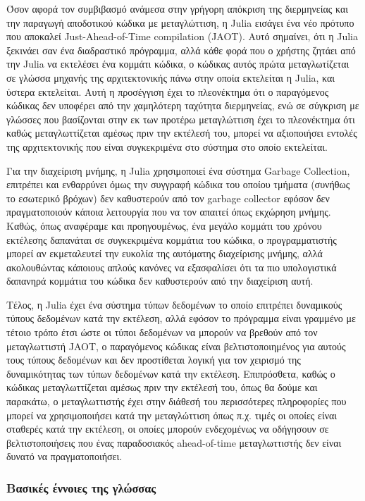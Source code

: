 Όσον αφορά τον συμβιβασμό ανάμεσα στην γρήγορη απόκριση της διερμηνείας και την παραγωγή αποδοτικού κώδικα με μεταγλώττιση, η Julia εισάγει ένα νέο πρότυπο που αποκαλεί Just-Ahead-of-Time compilation (JAOT).
Αυτό σημαίνει, ότι η Julia ξεκινάει σαν ένα διαδραστικό πρόγραμμα, αλλά κάθε φορά που ο χρήστης ζητάει από την Julia να εκτελέσει ένα κομμάτι κώδικα, ο κώδικας αυτός πρώτα μεταγλωτίζεται σε γλώσσα μηχανής της αρχιτεκτονικής πάνω στην οποία εκτελείται η Julia, και ύστερα εκτελείται.
Αυτή η προσέγγιση έχει το πλεονέκτημα ότι ο παραγόμενος κώδικας δεν υποφέρει από την χαμηλότερη ταχύτητα διερμηνείας, ενώ σε σύγκριση με γλώσσες που βασίζονται στην εκ των προτέρω μεταγλώττιση έχει το πλεονέκτημα ότι καθώς μεταγλωττίζεται αμέσως πριν την εκτέλεσή του, μπορεί να αξιοποιήσει εντολές της αρχιτεκτονικής που είναι συγκεκριμένα στο σύστημα στο οποίο εκτελείται.

Για την διαχείριση μνήμης, η Julia χρησιμοποιεί ένα σύστημα Garbage Collection, επιτρέπει και ενθαρρύνει όμως την συγγραφή κώδικα του οποίου τμήματα (συνήθως το εσωτερικό βρόχων) δεν καθυστερούν από τον garbage collector εφόσον δεν πραγματοποιούν κάποια λειτουργία που να τον απαιτεί όπως εκχώρηση μνήμης.
Καθώς, όπως αναφέραμε και προηγουμένως, ένα μεγάλο κομμάτι του χρόνου εκτέλεσης δαπανάται σε συγκεκριμένα κομμάτια του κώδικα, ο προγραμματιστής μπορεί αν εκμεταλευτεί την ευκολία της αυτόματης διαχείρισης μνήμης, αλλά ακολουθώντας κάποιους απλούς κανόνες να εξασφαλίσει ότι τα πιο υπολογιστικά δαπανηρά κομμάτια του κώδικα δεν καθυστερούν από την διαχείριση αυτή.

Τέλος, η Julia έχει ένα σύστημα τύπων δεδομένων το οποίο επιτρέπει δυναμικούς τύπους δεδομένων κατά την εκτέλεση, αλλά εφόσον το πρόγραμμα είναι γραμμένο με τέτοιο τρόπο έτσι ώστε οι τύποι δεδομένων να μπορούν να βρεθούν από τον μεταγλωττιστή JAOT, ο παραγόμενος κώδικας είναι βελτιστοποιημένος για αυτούς τους τύπους δεδομένων και δεν προστίθεται λογική για τον χειρισμό της δυναμικότητας των τύπων δεδομένων κατά την εκτέλεση.
Επιπρόσθετα, καθώς ο κώδικας μεταγλωττίζεται αμέσως πριν την εκτέλεσή του, όπως θα δούμε και παρακάτω, ο μεταγλωττιστής έχει στην διάθεσή του περισσότερες πληροφορίες που μπορεί να χρησιμοποιήσει κατά την μεταγλώττιση όπως π.χ. τιμές οι οποίες είναι σταθερές κατά την εκτέλεση, οι οποίες μπορούν ενδεχομένως να οδήγησουν σε βελτιστοποιήσεις που ένας παραδοσιακός ahead-of-time μεταγλωττιστής δεν είναι δυνατό να πραγματοποιήσει.

\subsubsection{Βασικές έννοιες της γλώσσας}

